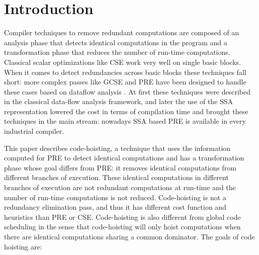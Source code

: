 \documentclass{sig-alternate}
\begin{document}
\section{Introduction}

Compiler techniques to remove redundant computations are composed of an analysis
phase that detects identical computations in the program and a transformation
phase that reduces the number of run-time computations.  Classical scalar
optimizations like CSE \cite{dragonbook} work very well on single basic blocks.
When it comes to detect redundancies across basic blocks these techniques fall
short: more complex passes like GCSE and PRE have been designed to handle these
cases based on dataflow analysis \cite{morel1979global}.  At first these
techniques were described in the classical data-flow analysis framework, and
later the use of the SSA representation lowered the cost in terms of compilation
time \cite{briggs1994effective,chow1997new,kennedy1999partial} and brought these
techniques in the main stream: nowadays SSA based PRE is available in every
industrial compiler.

This paper describes code-hoisting, a technique that uses the information
computed for PRE to detect identical computations and has a transformation phase
whose goal differs from PRE: it removes identical computations from different
branches of execution.  These identical computations in different branches of
execution are not redundant computations at run-time and the number of run-time
computations is not reduced. Code-hoisting is not a redundancy elimination pass,
and thus it has different cost function and heuristics than PRE or CSE.
Code-hoisting is also different from global code scheduling
\cite{dragonbook,click1995global} in the sense that code-hoisting will only
hoist computations when there are identical computations sharing a common
dominator. The goals of code hoisting are:
\end{document}
